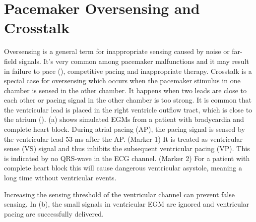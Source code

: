 \section{Pacemaker Oversensing and Crosstalk}
Oversensing is a general term for inappropriate sensing caused by noise or far-field signals. It's very common among pacemaker malfunctions and it may result in failure to pace (\cite{med2, leads}), competitive pacing and inappropriate therapy. Crosstalk is a special case for oversensing which occurs when the pacemaker stimulus in one chamber is sensed in the other chamber. It happens when two leads are close to each other or pacing signal in the other chamber is too strong. It is common that the ventricular lead is placed in the right ventricle outflow tract, which is close to the atrium (\cite{icd}). (a) shows simulated EGMs from a patient with bradycardia and complete heart block. During atrial pacing (AP), the pacing signal is sensed by the ventricular lead 53 ms after the AP. (Marker 1) It is treated as ventricular sense (VS) signal and thus inhibits the subsequent ventricular pacing (VP). This is indicated by no QRS-wave in the ECG channel. (Marker 2) For a patient with complete heart block this will cause dangerous ventricular asystole, meaning a long time without ventricular events.  

Increasing the sensing threshold of the ventricular channel can prevent false sensing. In (b), the small signals in ventricular EGM are ignored and ventricular pacing are successfully delivered. 


